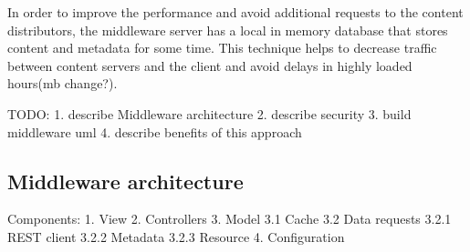 In order to improve the performance and avoid additional requests to the content distributors, the middleware server has a local in memory database that stores content and metadata for some time. This technique helps to decrease traffic between content servers and the client and avoid delays in highly loaded hours(mb change?).  



TODO:
1. describe Middleware architecture
2. describe security
3. build middleware uml
4. describe benefits of this approach

\subsection{Middleware architecture}


Components:
1. View
2. Controllers
3. Model
3.1 Cache
3.2 Data requests
3.2.1 REST client
3.2.2 Metadata 
3.2.3 Resource
4. Configuration



